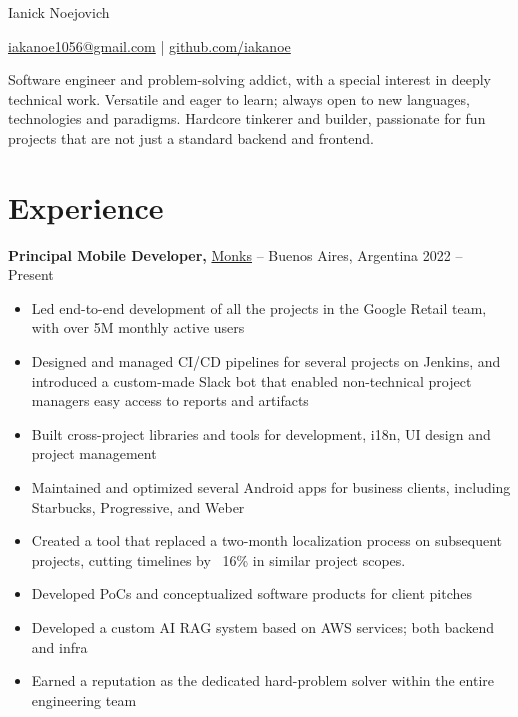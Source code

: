 \documentclass[11pt]{article}       %
\begin{document}
\centerline{\Huge Ianick Noejovich}

\vspace{3pt}

\centerline{\href{mailto:iakanoe1056@gmail.com}{iakanoe1056@gmail.com} | \href{https://github.com/iakanoe}{github.com/iakanoe}}

\vspace{18pt}

Software engineer and problem-solving addict, with a special interest in deeply technical work.
Versatile and eager to learn; always open to new languages, technologies and paradigms.
Hardcore tinkerer and builder, passionate for fun projects that are not just a standard backend and frontend.

\section*{Experience}

\textbf{Principal Mobile Developer,} \href{http://monks.com/}{Monks} -- Buenos Aires, Argentina \hfill 2022 -- Present \\
\vspace{-6pt}
\begin{itemize}
  \item Led end-to-end development of all the projects in the Google Retail team, with over 5M monthly active users
  \item Designed and managed CI/CD pipelines for several projects on Jenkins, and introduced a custom-made Slack bot that enabled non-technical project managers easy access to reports and artifacts
  \item Built cross-project libraries and tools for development, i18n, UI design and project management
  \item Maintained and optimized several Android apps for business clients, including Starbucks, Progressive, and Weber
  \item Created a tool that replaced a two-month localization process on subsequent projects, cutting timelines by ~16\% in similar project scopes.
  \item Developed PoCs and conceptualized software products for client pitches
  \item Developed a custom AI RAG system based on AWS services; both backend and infra
  \item Earned a reputation as the dedicated hard-problem solver within the entire engineering team
\end{itemize}
\end{document}
